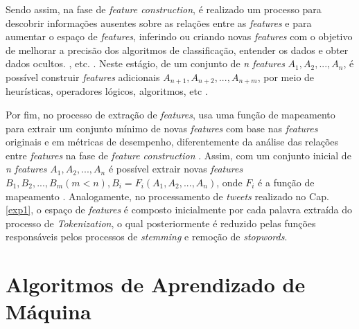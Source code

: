 \documentclass[
	12pt,				%
	oneside,			%
	a4paper,			%
	english,			%
	brazil				%
	]{abntex2ppgsi}
\begin{document}
Sendo assim, na fase de \textit{feature construction}, é realizado um processo para descobrir informações ausentes sobre as relações entre as \textit{features} e para aumentar o espaço de \textit{features}, inferindo ou criando novas \textit{features} com o objetivo de melhorar a precisão dos algoritmos de classificação, entender os dados e obter dados ocultos. , etc. \cite{motoda2002feature}. Neste estágio, de um conjunto de \textit{n features} $ A_1, A_2, ..., A_n $, é possível construir \textit{features} adicionais $ A_ {n + 1}, A_ {n + 2}, ... , A_ {n + m} $, por meio de heurísticas, operadores lógicos, algoritmos, etc \cite{motoda2002feature}.

Por fim, no processo de extração de \textit{features}, usa uma função de mapeamento para extrair um conjunto mínimo de novas \textit{features} com base nas \textit{features} originais e em métricas de desempenho, diferentemente da análise das relações entre \textit{features} na fase de \textit{feature construction} \cite{motoda2002feature}. Assim, com um conjunto inicial de \textit{n features} $ A_1, A_2, ..., A_n $ é possível extrair novas \textit{features} $ B_1, B_2, ..., B_m (m < n), B_i = F_i (A_1, A_2, ..., A_n) $, onde $ F_i $ é a função de mapeamento \cite {motoda2002feature}. Analogamente, no processamento de \textit{tweets} realizado no Cap. \ref{exp1}, o espaço de \textit{features} é composto inicialmente por cada palavra extraída do processo de \textit{Tokenization}, o qual posteriormente é reduzido pelas funções responsáveis pelos processos de \textit{stemming} e remoção de \textit{stopwords}.



\section{Algoritmos de Aprendizado de Máquina}
\label{classification}
\end{document}
